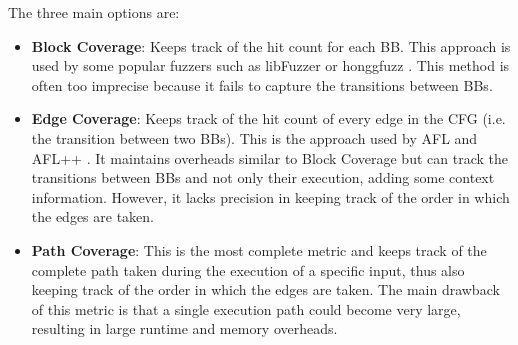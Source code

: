     The three main options are:
    \begin{itemize}
        \item \textbf{Block Coverage}: Keeps track of the hit count for each \gls{BB}. This approach is used by some
            popular fuzzers such as libFuzzer or honggfuzz \cite{CollAFL}. This method is often too imprecise because
            it fails to capture the transitions between BBs.
        \item \textbf{Edge Coverage}: Keeps track of the hit count of every edge in the \gls{CFG} (i.e. the transition between two \gls{BB}s).
            This is the approach used by AFL and AFL++ \cite{aflplusplus}. It maintains overheads similar to Block Coverage but can
            track the transitions between \gls{BB}s and not only their execution, adding some context information.
            However, it lacks precision in keeping track of the order in which the edges are taken.
        \item \textbf{Path Coverage}: This is the most complete metric and keeps track of the complete path taken during the execution
            of a specific input, thus also keeping track of the order in which the edges are taken.
            The main drawback of this metric is that a single execution path could become very large, resulting in
            large runtime and memory overheads.
    \end{itemize}

